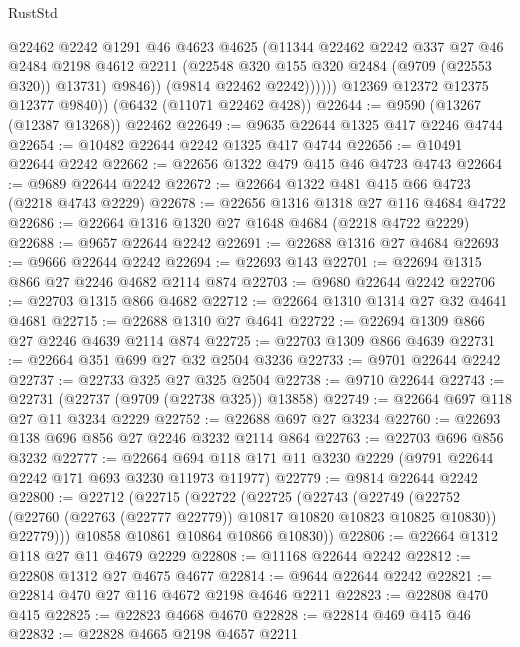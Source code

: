 \begin{lexlean}{RustStd}
\begin{coremodule}
                    @22462
                    @2242
                    @1291
                    @46
                    @4623
                    @4625
                    (@11344
                      @22462
                      @2242
                      @337
                      @27
                      @46
                      @2484
                      @2198
                      @4612
                      @2211
                      (@22548 @320 @155 @320 @2484 (@9709 (@22553 @320)) @13731)
                      @9846))
                  (@9814 @22462 @2242))))))
        @12369
        @12372
        @12375
        @12377
        @9840))
    (@6432 (@11071 @22462 @428))
@22644 := @9590 (@13267 (@12387 @13268)) @22462
@22649 := @9635 @22644 @1325 @417 @2246 @4744
@22654 := @10482 @22644 @2242 @1325 @417 @4744
@22656 := @10491 @22644 @2242
@22662 := @22656 @1322 @479 @415 @46 @4723 @4743
@22664 := @9689 @22644 @2242
@22672 := @22664 @1322 @481 @415 @66 @4723 (@2218 @4743 @2229)
@22678 := @22656 @1316 @1318 @27 @116 @4684 @4722
@22686 := @22664 @1316 @1320 @27 @1648 @4684 (@2218 @4722 @2229)
@22688 := @9657 @22644 @2242
@22691 := @22688 @1316 @27 @4684
@22693 := @9666 @22644 @2242
@22694 := @22693 @143
@22701 := @22694 @1315 @866 @27 @2246 @4682 @2114 @874
@22703 := @9680 @22644 @2242
@22706 := @22703 @1315 @866 @4682
@22712 := @22664 @1310 @1314 @27 @32 @4641 @4681
@22715 := @22688 @1310 @27 @4641
@22722 := @22694 @1309 @866 @27 @2246 @4639 @2114 @874
@22725 := @22703 @1309 @866 @4639
@22731 := @22664 @351 @699 @27 @32 @2504 @3236
@22733 := @9701 @22644 @2242
@22737 := @22733 @325 @27 @325 @2504
@22738 := @9710 @22644
@22743 := @22731 (@22737 (@9709 (@22738 @325)) @13858)
@22749 := @22664 @697 @118 @27 @11 @3234 @2229
@22752 := @22688 @697 @27 @3234
@22760 := @22693 @138 @696 @856 @27 @2246 @3232 @2114 @864
@22763 := @22703 @696 @856 @3232
@22777 := @22664 @694 @118 @171 @11 @3230 @2229 (@9791 @22644 @2242 @171 @693 @3230 @11973 @11977)
@22779 := @9814 @22644 @2242
@22800 := @22712
    (@22715
      (@22722
        (@22725
          (@22743
            (@22749
              (@22752 (@22760 (@22763 (@22777 @22779)) @10817 @10820 @10823 @10825 @10830))
              @22779)))
        @10858
        @10861
        @10864
        @10866
        @10830))
@22806 := @22664 @1312 @118 @27 @11 @4679 @2229
@22808 := @11168 @22644 @2242
@22812 := @22808 @1312 @27 @4675 @4677
@22814 := @9644 @22644 @2242
@22821 := @22814 @470 @27 @116 @4672 @2198 @4646 @2211
@22823 := @22808 @470 @415
@22825 := @22823 @4668 @4670
@22828 := @22814 @469 @415 @46
@22832 := @22828 @4665 @2198 @4657 @2211

\end{coremodule}
\end{lexlean}
